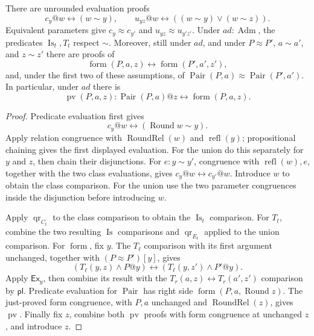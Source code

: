 \begin{lemma}
\label{rel-pair-congruence}
There are unrounded evaluation proofs
\[
 c_y@w\leftrightarrow(w\sim y),\qquad
 u_{yz}@w\leftrightarrow((w\sim y)\lor(w\sim z)).
\]
Equivalent parameters give \(c_y\approx c_{y'}\) and
\(u_{yz}\approx u_{y'z'}\).  Under \(ad:\operatorname{Adm}\),
the predicates \(\operatorname{Is}_t,T_t\) respect \(\sim\).
Moreover, still under \(ad\), and under \(P\approx P'\),
\(a\sim a'\), and \(z\sim z'\)
there are proofs of
\[
 \operatorname{form}(P,a,z)\leftrightarrow
       \operatorname{form}(P',a',z'),
\]
and, under the first two of these assumptions, of
\(\operatorname{Pair}(P,a)\approx\operatorname{Pair}(P',a')\).
In particular, under \(ad\) there is
\[
 \operatorname{pv}(P,a,z):
  \operatorname{Pair}(P,a)@z
       \leftrightarrow\operatorname{form}(P,a,z).
\]
\end{lemma}
\begin{proof}
Predicate evaluation first gives
\[
 c_y@w\leftrightarrow(\operatorname{Round}w\sim y).
\]
Apply relation congruence with
\(\operatorname{RoundRel}(w)\) and \(\operatorname{refl}(y)\);
propositional chaining gives the first displayed evaluation.
For the union do this separately for \(y\) and \(z\), then chain
their disjunctions.  For \(e:y\sim y'\), congruence with
\(\operatorname{refl}(w),e\), together with the two class
evaluations, gives \(c_y@w\leftrightarrow c_{y'}@w\).
Introduce \(w\) to obtain the class comparison.  For the union
use the two parameter congruences inside the disjunction before
introducing \(w\).

Apply \(\operatorname{qr}_{C_t}\) to the class comparison to
obtain the \(\operatorname{Is}_t\) comparison.  For \(T_t\),
combine the two resulting \(\operatorname{Is}\) comparisons and
\(\operatorname{qr}_{E_t}\) applied to the union comparison.
For \(\operatorname{form}\), fix \(y\).  The \(T_\ell\)
comparison with its first argument unchanged, together with
\((P\approx P')[y]\), gives
\[
 (T_\ell(y,z)\land P@y)\leftrightarrow
           (T_\ell(y,z')\land P'@y).
\]
Apply \(\mathsf{Ex}_y\), then combine its result with the
\(T_r(a,z)\leftrightarrow T_r(a',z')\) comparison by
\(\mathsf{pl}\).  Predicate evaluation for \(\operatorname{Pair}\)
has right side
\(\operatorname{form}(P,a,\operatorname{Round}z)\).
The just-proved form congruence, with \(P,a\) unchanged and
\(\operatorname{RoundRel}(z)\), gives \(\operatorname{pv}\).
Finally fix \(z\), combine both \(\operatorname{pv}\) proofs
with form congruence at unchanged \(z\), and introduce \(z\).
\end{proof}

